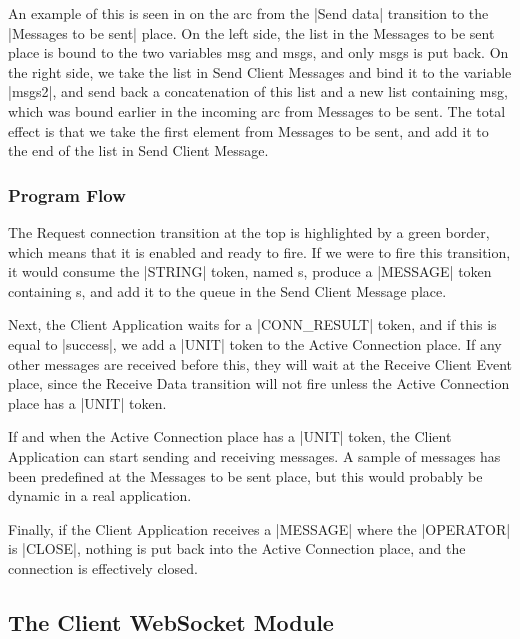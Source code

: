 		An example of this is seen in  on the arc
		from the |Send data| transition to the 
		|Messages to be sent| place. On the left side, the list in the
		Messages to be sent place is bound to the two variables msg and msgs, and only
		msgs is put back. On the right side, we take the list in Send Client Messages
		and bind it to the variable |msgs2|, and send back a concatenation
		of this list and a new list containing msg, which was bound earlier in the incoming arc
		from Messages to be sent. The total effect is that we take the first element
		from Messages to be sent, and add it to the end of the list in Send Client
		Message.

	\subsubsection{Program Flow}
	
		The Request connection transition at the top is highlighted by a green border,
		which means that it is enabled and ready to fire. If we were to fire this transition,
		it would consume the |STRING| token, named s, produce a
		|MESSAGE| token containing s, and add it to the queue in the Send
		Client Message place.
		
		Next, the Client Application waits for a |CONN_RESULT| token, and if
		this is equal to |success|, we add a |UNIT| token to the
		Active Connection place. If any other messages are received before this, they
		will wait at the Receive Client Event place, since the Receive Data transition
		will not fire unless the Active Connection place has a |UNIT| token.
		
		If and when the Active Connection place has a |UNIT| token, the
		Client Application can start sending and receiving messages. A sample of
		messages has been predefined at the Messages to be sent place, but this would
		probably be dynamic in a real application. 
		
		Finally, if the Client Application receives a |MESSAGE| where the
		|OPERATOR| is |CLOSE|, nothing is put back into the Active
		Connection place, and the connection is effectively closed. 

\subsection{The Client WebSocket Module}


